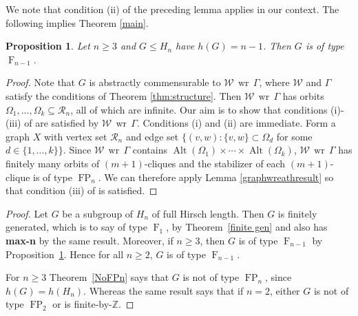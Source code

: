\documentclass[11pt,a4paper]{amsart}
\newtheorem{proposition}[theorem]{Proposition}
\theoremstyle{definition}
\theoremstyle{remark}
\newcommand{\Alt}{\operatorname{Alt}}
\newcommand{\Z}{\mathbb Z}
\newcommand{\Ra}{\mathcal{R}}
\newcommand{\FFF}{\operatorname{F}}
\newcommand{\FP}{\operatorname{FP}}
\renewcommand{\wr}{\operatorname{\,wr\,}}
\begin{document}
We note that condition (ii) of the preceding lemma applies in our context. The following implies Theorem \ref{main}.
\begin{proposition} \label{Type Fn}  Let $n\ge 3$ and $G\le H_n$ have $h(G)=n-1$. Then $G$ is of type $\FFF_{n-1}$.
\end{proposition}
\begin{proof} Note that $G$ is abstractly commensurable to $\mathcal{W}\wr \Gamma$, where $\mathcal{W}$ and $\Gamma$ satisfy the conditions of Theorem \ref{thm:structure}. Then $\mathcal{W}\wr \Gamma$ has orbits $\Omega_1, \ldots, \Omega_k\subseteq \Ra_n$, all of which are infinite. Our aim is to show that conditions (i)-(iii) of \cite[Theorem A]{KM1} are satisfied by $\mathcal{W}\wr \Gamma$. Conditions (i) and (ii) are immediate. Form a graph $X$ with vertex set $\Ra_n$ and edge set $\{(v, w) : \{v, w\}\subset \Omega_d$ for some $d\in \{1, \ldots, k\}\}$. Since $\mathcal{W}\wr \Gamma$ contains $\Alt(\Omega_1)\times\cdots\times\Alt(\Omega_k)$, $\mathcal{W}\wr \Gamma$ has finitely many orbits of $(m+1)$-cliques and the stabilizer of each $(m+1)$-clique is of type $\FP_n$. We can therefore apply Lemma \ref{graphwreathresult} so that condition (iii) of \cite[Theorem A]{KM1} is satisfied.
\end{proof} 

\main


\begin{proof}
	Let $G$ be a subgroup of $H_n$ of full Hirsch length. Then $G$ is finitely generated, which is to say of type $\FFF_1$, by Theorem~\ref{finite gen} and also has \textbf{max-n} by the same result. Moreover, if $n \ge 3$, then $G$ is of type $\FFF_{n-1}$ by Proposition~\ref{Type Fn}. Hence for all $n \ge 2$, $G$ is of type $\FFF_{n-1}$. 
	
	For $n \ge 3$ Theorem~\ref{NoFPn} says that $G$ is not of type $\FP_{n}$, since $h(G)=h(H_n)$. Whereas the same result says that if $n=2$, either $G$ is not of type $\FP_2$ or is finite-by-$\Z$. 
\end{proof}
\end{document}

